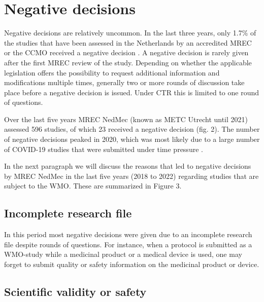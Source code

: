 \documentclass[authordate, meta]{jote-new-article}
\begin{document}
\section{Negative decisions}



Negative decisions are relatively uncommon. In the last three years, only 1.7\% of the studies that have been assessed in the Netherlands by an accredited MREC or the CCMO received a negative decision \parencites{CCMO2023}. A negative decision is rarely given after the first MREC review of the study. Depending on whether the applicable legislation offers the possibility to request additional information and modifications multiple times, generally two or more rounds of discussion take place before a negative decision is issued. Under CTR this is limited to one round of questions.







Over the last five years MREC NedMec (known as METC Utrecht until 2021) assessed 596 studies, of which 23 received a negative decision (fig. 2). The number of negative decisions peaked in 2020, which was most likely due to a large number of COVID-19 studies that were submitted under time pressure \parencites{METCUtrecht2020}.



In the next paragraph we will discuss the reasons that led to negative decisions by MREC NedMec in the last five years (2018 to 2022) regarding studies that are subject to the WMO. These are summarized in Figure 3.







\subsection{Incomplete research file}



In this period most negative decisions were given due to an incomplete research file despite rounds of questions. For instance, when a protocol is submitted as a WMO-study while a medicinal product or a medical device is used, one may forget to submit quality or safety information on the medicinal product or device.







\subsection{Scientific validity or safety}
\end{document}

